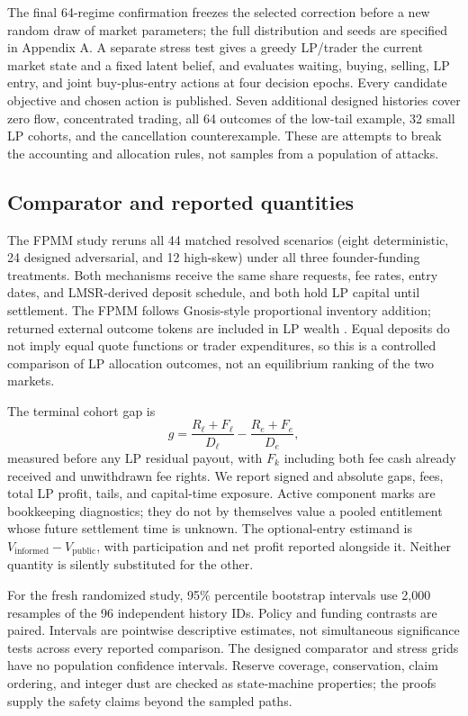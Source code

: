\documentclass[10pt]{article}
\begin{document}
The final 64-regime confirmation freezes the selected correction before a new random draw of market parameters; the full distribution and seeds are specified in Appendix A. A separate stress test gives a greedy LP/trader the current market state and a fixed latent belief, and evaluates waiting, buying, selling, LP entry, and joint buy-plus-entry actions at four decision epochs. Every candidate objective and chosen action is published. Seven additional designed histories cover zero flow, concentrated trading, all 64 outcomes of the low-tail example, 32 small LP cohorts, and the cancellation counterexample. These are attempts to break the accounting and allocation rules, not samples from a population of attacks.

\subsection{Comparator and reported quantities}

The FPMM study reruns all 44 matched resolved scenarios (eight deterministic, 24 designed adversarial, and 12 high-skew) under all three founder-funding treatments. Both mechanisms receive the same share requests, fee rates, entry dates, and LMSR-derived deposit schedule, and both hold LP capital until settlement. The FPMM follows Gnosis-style proportional inventory addition; returned external outcome tokens are included in LP wealth \cite{gnosisfpmmcode}. Equal deposits do not imply equal quote functions or trader expenditures, so this is a controlled comparison of LP allocation outcomes, not an equilibrium ranking of the two markets.

The terminal cohort gap is
\[
g=\frac{R_\ell+F_\ell}{D_\ell}-\frac{R_e+F_e}{D_e},
\]
measured before any LP residual payout, with $F_k$ including both fee cash already received and unwithdrawn fee rights. We report signed and absolute gaps, fees, total LP profit, tails, and capital-time exposure. Active component marks are bookkeeping diagnostics; they do not by themselves value a pooled entitlement whose future settlement time is unknown. The optional-entry estimand is $V_{\mathrm{informed}}-V_{\mathrm{public}}$, with participation and net profit reported alongside it. Neither quantity is silently substituted for the other.

For the fresh randomized study, 95\% percentile bootstrap intervals use 2,000 resamples of the 96 independent history IDs. Policy and funding contrasts are paired. Intervals are pointwise descriptive estimates, not simultaneous significance tests across every reported comparison. The designed comparator and stress grids have no population confidence intervals. Reserve coverage, conservation, claim ordering, and integer dust are checked as state-machine properties; the proofs supply the safety claims beyond the sampled paths.
\end{document}
